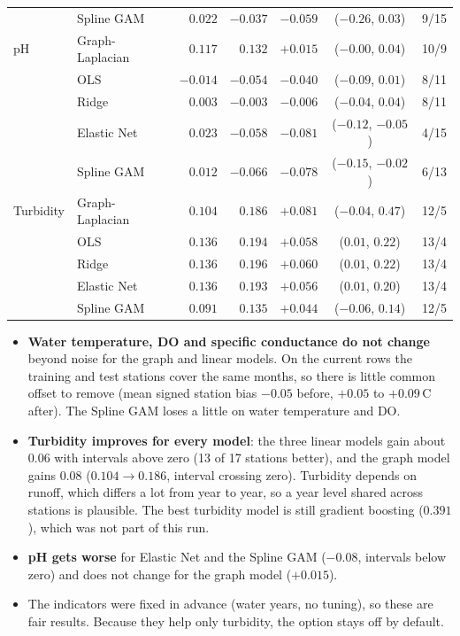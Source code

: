 \documentclass[11pt]{article}
\begin{document}
\begin{table}[h]
\begin{tabular}{ll rrrcc}
              & Spline GAM      & $0.022$ & $-0.037$ & $-0.059$ & ($-0.26$, $0.03$) & 9/15 \\
\addlinespace
pH            & Graph-Laplacian & $0.117$ & $0.132$ & $+0.015$ & ($-0.00$, $0.04$) & 10/9 \\
              & OLS             & $-0.014$ & $-0.054$ & $-0.040$ & ($-0.09$, $0.01$) & 8/11 \\
              & Ridge           & $0.003$ & $-0.003$ & $-0.006$ & ($-0.04$, $0.04$) & 8/11 \\
              & Elastic Net     & $0.023$ & $-0.058$ & $\mathbf{-0.081}$ & ($-0.12$, $-0.05$) & 4/15 \\
              & Spline GAM      & $0.012$ & $-0.066$ & $\mathbf{-0.078}$ & ($-0.15$, $-0.02$) & 6/13 \\
\addlinespace
Turbidity     & Graph-Laplacian & $0.104$ & $0.186$ & $+0.081$ & ($-0.04$, $0.47$) & 12/5 \\
              & OLS             & $0.136$ & $0.194$ & $\mathbf{+0.058}$ & ($0.01$, $0.22$) & 13/4 \\
              & Ridge           & $0.136$ & $0.196$ & $\mathbf{+0.060}$ & ($0.01$, $0.22$) & 13/4 \\
              & Elastic Net     & $0.136$ & $0.193$ & $\mathbf{+0.056}$ & ($0.01$, $0.20$) & 13/4 \\
              & Spline GAM      & $0.091$ & $0.135$ & $+0.044$ & ($-0.06$, $0.14$) & 12/5 \\
\bottomrule
\end{tabular}
\end{table}

\begin{itemize}
  \item \textbf{Water temperature, DO and specific conductance do not change} beyond noise for the
        graph and linear models. On the current rows the training and test stations cover the same
        months, so there is little common offset to remove (mean signed station bias $-0.05$ before,
        $+0.05$ to $+0.09$\,\textdegree C after). The Spline GAM loses a little on water temperature
        and DO.
  \item \textbf{Turbidity improves for every model}: the three linear models gain about $0.06$ with
        intervals above zero (13 of 17 stations better), and the graph model gains $0.08$
        ($0.104\to0.186$, interval crossing zero). Turbidity depends on runoff, which differs a lot
        from year to year, so a year level shared across stations is plausible. The best turbidity
        model is still gradient boosting ($0.391$), which was not part of this run.
  \item \textbf{pH gets worse} for Elastic Net and the Spline GAM ($-0.08$, intervals below zero)
        and does not change for the graph model ($+0.015$).
  \item The indicators were fixed in advance (water years, no tuning), so these are fair results.
        Because they help only turbidity, the option stays off by default.
\end{itemize}
\end{document}
